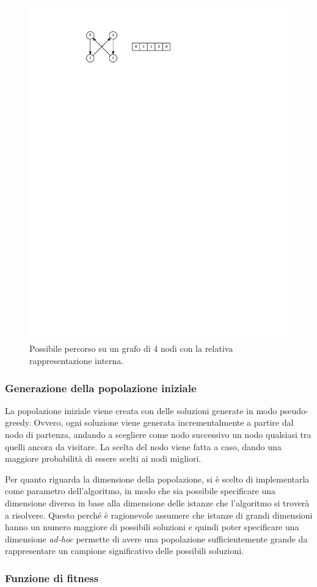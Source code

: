 \begin{figure}[htbp]
	\centering
	\includegraphics[width=.6\textwidth]{immagini/path-rappr.pdf}
	\caption{Possibile percorso su un grafo di 4 nodi con la relativa rappresentazione interna.}\label{fig:rappr}
\end{figure}

\subsubsection{Generazione della popolazione iniziale}

La popolazione iniziale viene creata con delle soluzioni generate in modo pseudo-greedy.
Ovvero, ogni soluzione viene generata incrementalmente a partire dal nodo di partenza, andando a scegliere come nodo successivo un nodo qualsiasi tra quelli ancora da visitare.
La scelta del nodo viene fatta a caso, dando una maggiore probabilità di essere scelti ai nodi migliori.

Per quanto riguarda la dimensione della popolazione, si è scelto di implementarla come parametro dell'algoritmo, in modo che sia possibile specificare una dimensione diversa in base alla dimensione delle istanze che l'algoritmo si troverà a risolvere.
Questo perché è ragionevole assumere che istanze di grandi dimensioni hanno un numero maggiore di possibili soluzioni e quindi poter specificare una dimensione \textit{ad-hoc} permette di avere una popolazione sufficientemente grande da rappresentare un campione significativo delle possibili soluzioni.

\subsubsection{Funzione di fitness}


